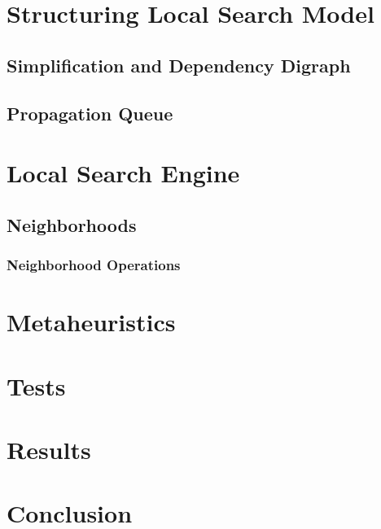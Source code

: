 \documentclass[a4paper,12pt]{article}
\begin{document}
\section{Structuring Local Search Model}

  \subsection{Simplification and Dependency Digraph}
     \label{sec_ddg}
  \subsection{Propagation Queue}  
    \label{sec_propaqueue}
    
  
  
\section{Local Search Engine}
  \subsection{Neighborhoods}
    \subsubsection{Neighborhood Operations}
\section{Metaheuristics}
\section{Tests}
\section{Results}
\section{Conclusion}
\end{document}
